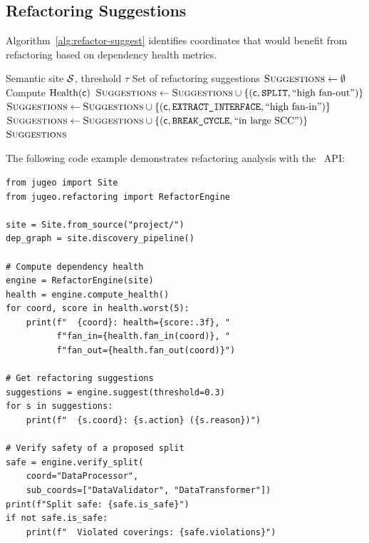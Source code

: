 \documentclass[11pt]{article}
\begin{document}
\subsection{Refactoring Suggestions}\label{sec:refactor-suggest}

Algorithm~\ref{alg:refactor-suggest} identifies coordinates that would
benefit from refactoring based on dependency health metrics.

\begin{algorithm}[H]
\caption{Dependency-Guided Refactoring Suggestions}\label{alg:refactor-suggest}
\begin{algorithmic}[1]
\REQUIRE Semantic site $\mathcal{S}$, threshold $\tau$
\ENSURE Set of refactoring suggestions
\STATE $\textsc{Suggestions} \leftarrow \emptyset$
  \STATE Compute $\mathrm{Health}(\mathsf{c})$
      \STATE $\textsc{Suggestions} \leftarrow \textsc{Suggestions} \cup
             \{(\mathsf{c}, \texttt{SPLIT}, \text{``high fan-out''})\}$
    \ENDIF
      \STATE $\textsc{Suggestions} \leftarrow \textsc{Suggestions} \cup
             \{(\mathsf{c}, \texttt{EXTRACT\_INTERFACE}, \text{``high fan-in''})\}$
    \ENDIF
      \STATE $\textsc{Suggestions} \leftarrow \textsc{Suggestions} \cup
             \{(\mathsf{c}, \texttt{BREAK\_CYCLE}, \text{``in large SCC''})\}$
    \ENDIF
  \ENDIF
\ENDFOR
\RETURN $\textsc{Suggestions}$
\end{algorithmic}
\end{algorithm}

The following code example demonstrates refactoring analysis with the
\JuGeo\ API:

\begin{lstlisting}[style=jugeo-python]
from jugeo import Site
from jugeo.refactoring import RefactorEngine

site = Site.from_source("project/")
dep_graph = site.discovery_pipeline()

# Compute dependency health
engine = RefactorEngine(site)
health = engine.compute_health()
for coord, score in health.worst(5):
    print(f"  {coord}: health={score:.3f}, "
          f"fan_in={health.fan_in(coord)}, "
          f"fan_out={health.fan_out(coord)}")

# Get refactoring suggestions
suggestions = engine.suggest(threshold=0.3)
for s in suggestions:
    print(f"  {s.coord}: {s.action} ({s.reason})")

# Verify safety of a proposed split
safe = engine.verify_split(
    coord="DataProcessor",
    sub_coords=["DataValidator", "DataTransformer"])
print(f"Split safe: {safe.is_safe}")
if not safe.is_safe:
    print(f"  Violated coverings: {safe.violations}")
\end{lstlisting}
\end{document}
